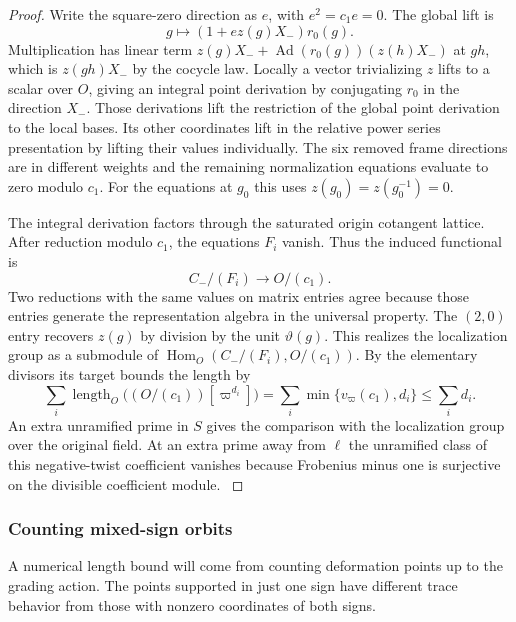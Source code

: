 \begin{proof}
Write the square-zero direction as \(e\), with \(e^2=c_1e=0\). The global lift is
\[
 g\longmapsto (1+e z(g)X_-)r_0(g).
\]
Multiplication has linear term \(z(g)X_-+\operatorname{Ad}(r_0(g))(z(h)X_-)\) at \(gh\), which is \(z(gh)X_-\) by the cocycle law. Locally a vector
trivializing \(z\) lifts to a scalar over \(O\), giving an
integral point derivation by conjugating \(r_0\) in the
direction \(X_-\). Those derivations lift the restriction of
the global point derivation to the local bases. Its other
coordinates lift in the relative power series presentation
by lifting their values individually. The six removed
frame directions are in different weights and the remaining
normalization equations evaluate to zero modulo \(c_1\).
For the equations at \(g_0\) this uses
\(z(g_0)=z(g_0^{-1})=0\).

The integral derivation factors through the saturated origin
cotangent lattice. After reduction modulo \(c_1\), the equations
\(F_i\) vanish. Thus the induced functional is
\[
              C_-/(F_i)\longrightarrow O/(c_1).
\] Two reductions with the same values
on matrix entries agree because those entries generate the
representation algebra in the universal property. The
\((2,0)\) entry recovers \(z(g)\) by division by the unit
\(\vartheta(g)\). This realizes the localization group as a
submodule of
\(\operatorname{Hom}_O(C_-/(F_i),O/(c_1))\).
By the elementary divisors its target bounds the length by
\[
  \sum_i\operatorname{length}_O\bigl((O/(c_1))[\varpi^{d_i}]\bigr)
     =\sum_i\min\{v_\varpi(c_1),d_i\}\le\sum_i d_i .
\] An extra unramified prime in \(S\) gives the comparison with the localization group over the original field. At an extra prime away from
\(\ell\) the unramified class of this negative-twist
coefficient vanishes because Frobenius minus one is surjective
on the divisible coefficient module.
\label{cor:ordinary-symplectic-cohomology-8}

\end{proof}

\subsubsection{Counting mixed-sign orbits}

A numerical length bound will come from counting deformation points up to the grading action. The points supported in just one sign have different trace behavior from those with nonzero coordinates of both signs.

